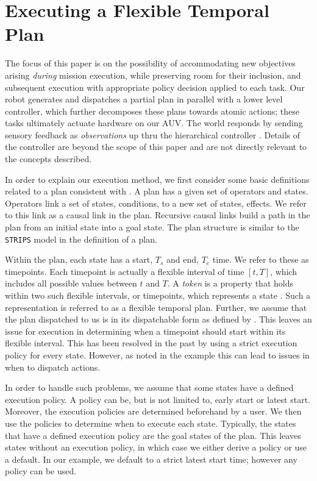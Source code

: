 \section{Executing a Flexible Temporal Plan}
\label{sec: defs}

The focus of this paper is on the possibility of accommodating new
objectives arising \emph{during} mission execution, while preserving
room for their inclusion, and subsequent execution with appropriate
policy decision applied to each task. Our robot generates and
dispatches a partial plan in parallel with a lower level controller,
which further decomposes these plans towards atomic actions; these
tasks ultimately actuate hardware on our AUV. The world responds by
sending sensory feedback as \emph{observations} up thru the
hierarchical controller \cite{mcgann08b,rajan12}. Details of the
controller are beyond the scope of this paper and are not directly
relevant to the concepts described.

In order to explain our execution method, we first consider some basic
definitions related to a plan consistent with \cite{Nau:2004}. A plan
has a given set of operators and states.  Operators link a set of
states, conditions, to a new set of states, effects. We refer to this
link as a causal link in the plan. Recursive causal links build a path
in the plan from an initial state into a goal state. The plan
structure is similar to the \texttt{STRIPS} model in the definition of
a plan.

Within the plan, each state has a start, $T_s$ and end, $T_e$ time. We
refer to these as timepoints. Each timepoint is actually a flexible
interval of time $[t, T]$, which includes all possible values between
$t$ and $T$.  A \emph{token} is a property that holds within two such
flexible intervals, or timepoints, which represents a state
\cite{py10}.  Such a representation is referred to as a flexible
temporal plan. Further, we assume that the plan dispatched to us is in
its dispatchable form as defined by \cite{mus98a}.  This leaves an
issue for execution in determining when a timepoint should start
within its flexible interval. This has been resolved in the past by
using a strict execution policy for every state. However, as noted in
the example this can lead to issues in when to dispatch actions.

In order to handle such problems, we assume that some states have a
defined execution policy.  A policy can be, but is not limited to,
early start or latest start.  Moreover, the execution policies are
determined beforehand by a user. We then use the policies to determine
when to execute each state. Typically, the states that have a defined
execution policy are the goal states of the plan. This leaves states
without an execution policy, in which case we either derive a policy
or use a default. In our example, we default to a strict latest start
time; however any policy can be used.


